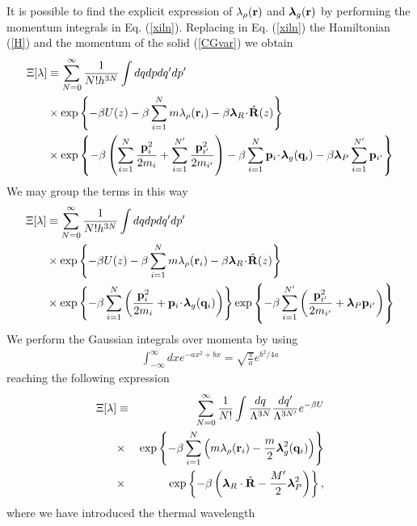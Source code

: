\documentclass[a4paper,openright,12pt]{book}
\newcommand{\esc}{\!\cdot\!}
\begin{document}
It is possible to find the explicit expression of $\lambda_{\rho}({\bf r})$ and $\boldsymbol{\lambda}_g({\bf r})$ by performing the momentum integrals in Eq. (\ref{xiln}). Replacing in Eq. (\ref{xiln}) the Hamiltonian (\ref{H}) and the momentum of the solid (\ref{CGvar}) we obtain 
\begin{align}
\Xi[\lambda]
&\equiv
\sum_{N=0}^\infty \frac{1}{N!h^{3N}}
\int dqdpdq'dp'
\nonumber \\
&\times\exp\left\{-\beta U(z)-\beta \sum_{i=1}^Nm\lambda_\rho({\bf
    r}_i) -\beta \boldsymbol{\lambda}_{R}\esc\hat{\bf R}(z) \right\}
\nonumber \\
&\times
\exp\left\{-\beta \left(\sum_{i=1}^N\frac{{\bf p}_i^2}{2m_i} + \sum_{i=1}^{N'}\frac{{\bf p}_{i'}^2}{2m_{i'}} \right) - \beta \sum_{i=1}^N{\bf p}_i\esc\boldsymbol{\lambda}_g({\bf q}_i) 
-\beta \boldsymbol{\lambda}_P\sum_{i=1}^{N'}{\bf p}_{i'}\right\}
\end{align}
We may group the terms in this way
\begin{align}
\Xi[\lambda]
&\equiv
\sum_{N=0}^\infty \frac{1}{N!h^{3N}}
\int dqdpdq'dp'
\nonumber \\
&\times\exp\left\{-\beta U(z)-\beta \sum_{i=1}^Nm\lambda_\rho({\bf
    r}_i) -\beta \boldsymbol{\lambda}_{R}\esc\hat{\bf R}(z) \right\}
\nonumber \\
&\times
\exp\left\{-\beta \sum_{i=1}^N\left(\frac{{\bf p}_i^2}{2m_i} + {\bf p}_i\esc\boldsymbol{\lambda}_g({\bf q}_i)\right)\right\}
\exp\left\{-\beta \sum_{i=1}^{N'}\left(\frac{{\bf p}_{i'}^2}{2m_{i'}} + \boldsymbol{\lambda}_P{\bf p}_{i'}\right) \right\}
\end{align}
We perform the Gaussian integrals over momenta by using 
\begin{align}
\int_{-\infty}^{\infty} dx e^{-ax^2+bx}=\sqrt{\frac{\pi}{a}}e^{b^2/4a} 
\end{align}
reaching the following expression 
\begin{eqnarray}
\Xi [\lambda]
&\equiv&
 \sum_{N=0}^\infty \frac{1}{N!}
\int \frac{dq}{\Lambda^{3N}}\frac{dq'}{\Lambda^{3N'}}e^{-\beta U}
\nonumber\\
&\times&\exp\left\{-\beta \sum_{i=1}^N\left(m\lambda_\rho({\bf
    r}_i)-\frac{m}{2}\boldsymbol{\lambda}_{g}^2({\bf q}_i)\right)\right\}
\nonumber\\
&\times&\exp\left\{-\beta \left(\boldsymbol{\lambda}_R\cdot\hat{\bf R}-\frac{M'}{2}\boldsymbol{\lambda}_{P}^2\right)\right\},
\label{xiln2}
\end{eqnarray}
where we have introduced the thermal wavelength 
\end{document}
